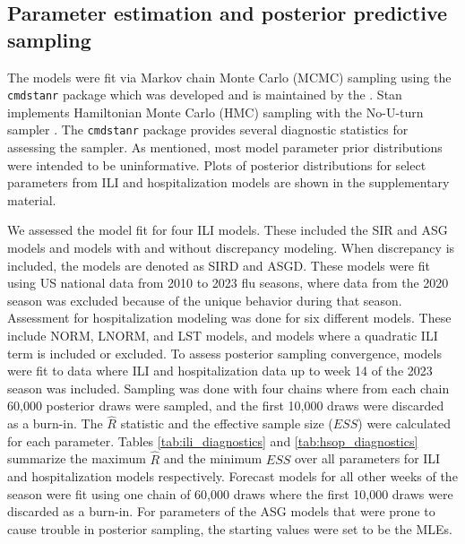 \documentclass[ba]{imsart}
\theoremstyle{plain}
\theoremstyle{definition}
\theoremstyle{remark}
\begin{document}



 
   











\subsection{Parameter estimation and posterior predictive sampling}
\label{sec:implementation_posterior}

The models were fit via Markov chain Monte Carlo (MCMC) sampling using the \texttt{cmdstanr} package which was developed and is maintained by the \cite{stan2024manual} \cite[]{gabry2022stan}. Stan implements Hamiltonian Monte Carlo (HMC) sampling with the No-U-turn sampler \cite[]{hoffman2014no}. The \texttt{cmdstanr} package provides several diagnostic statistics for assessing the sampler.
As mentioned, most model parameter prior distributions were intended to be uninformative.
Plots of posterior distributions for select parameters from ILI and hospitalization models are shown in the supplementary material.

We assessed the model fit for four ILI models. These included the SIR and ASG models and models with and without discrepancy modeling. When discrepancy is included, the models are denoted as SIRD and ASGD. These models were fit using US national data from 2010 to 2023 flu seasons, where data from the 2020 season was excluded because of the unique behavior during that season. Assessment for hospitalization modeling was done for six different models. These include NORM, LNORM, and LST models, and models where a quadratic ILI term is included or excluded. To assess posterior sampling convergence, models were fit to data where ILI and hospitalization data up to week 14 of the 2023 season was included. Sampling was done with four chains where from each chain 60,000 posterior draws were sampled, and the first 10,000 draws were discarded as a burn-in. The $\hat{R}$ statistic \cite[]{vehtari2021rank} and the effective sample size ($ESS$) \cite[]{gelman2013bayesian} were calculated for each parameter. Tables \ref{tab:ili_diagnostics} and \ref{tab:hsop_diagnostics} summarize the maximum $\hat{R}$ and the minimum $ESS$ over all parameters for ILI and hospitalization models respectively. Forecast models for all other weeks of the season were fit using one chain of 60,000 draws where the first 10,000 draws were discarded as a burn-in. 
For parameters of the ASG models that were prone to cause trouble in posterior sampling, the starting values were set to be the MLEs. 
\end{document}
